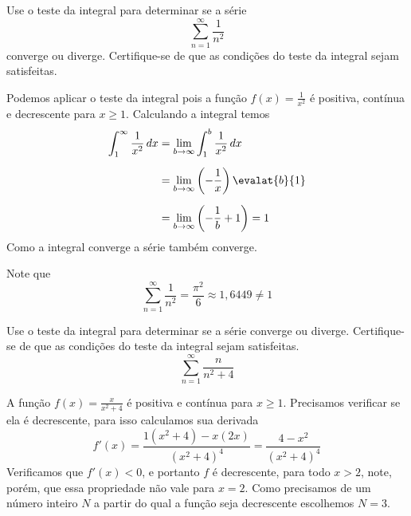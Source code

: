 \begin{exercises}

\begin{exercise}
Use o teste da integral para determinar se a série
\[
  \sum_{n=1}^{\infty} \frac{1}{n^2}
\]
converge ou diverge.
Certifique-se de que as condições do teste da integral sejam satisfeitas.
\begin{answer}
Podemos aplicar o teste da integral pois a função $f(x)=\frac{1}{x^2}$
é positiva, contínua e decrescente para $x\geq 1$. Calculando a integral temos
\begin{align*}
	\int_{1}^{\infty} \frac{1}{x^2}\,dx & = \lim_{b\to\infty} \int_{1}^{b} \frac{1}{x^2}\,dx           \\[2mm]
	                                    & = \lim_{b\to\infty} \left( -\frac{1}{x} \right)\evalat{b}{1} \\[2mm]
	                                    & = \lim_{b\to\infty} \left( -\frac{1}{b} +1 \right) = 1
\end{align*}
Como a integral converge a série também converge.

Note que
\[ \sum_{n=1}^{\infty} \frac{1}{n^2} = \frac{\pi^2}{6} \approx 1,6449 \neq 1 \]
\end{answer}
\end{exercise}

\begin{exercise}
  Use o teste da integral para determinar se a série converge ou diverge.
  Certifique-se de que as condições do teste da integral sejam satisfeitas.
  \[
    \sum_{n=1}^{\infty} \frac{n}{n^2+4}
  \]
  \begin{answer}
    A função \(f(x)=\frac{x}{x^2+4}\) é positiva e contínua para $x\geq 1$.
    Precisamos verificar se ela é decrescente, para isso calculamos sua derivada
    \[
    f'(x)
    = \frac{1(x^2+4) - x(2x)}{(x^2+4)^4}
    = \frac{4-x^2}{(x^2+4)^4}
    \]
    Verificamos que $f'(x)<0$, e portanto $f$ é decrescente, para todo $x>2$,
    note, porém, que essa propriedade não vale para $x=2$.
    Como precisamos de um número inteiro $N$ a partir do qual
    a função seja decrescente escolhemos $N=3$.


\end{answer}
\end{exercise}
\end{exercises}
